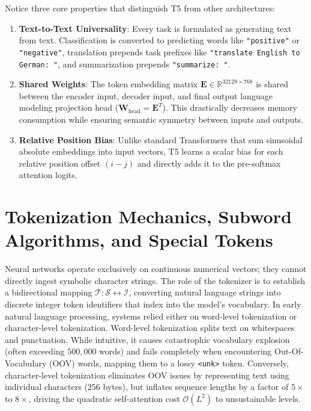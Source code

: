 \documentclass[11pt,a4paper]{article}
\begin{document}
Notice three core properties that distinguish T5 from other architectures:
\begin{enumerate}
    \item \textbf{Text-to-Text Universality}: Every task is formulated as generating text from text. Classification is converted to predicting words like \texttt{"positive"} or \texttt{"negative"}, translation prepends task prefixes like \texttt{"translate English to German: "}, and summarization prepends \texttt{"summarize: "}.
    \item \textbf{Shared Weights}: The token embedding matrix $\mathbf{E} \in \mathbb{R}^{32128 \times 768}$ is shared between the encoder input, decoder input, and final output language modeling projection head ($\mathbf{W}_{\text{head}} = \mathbf{E}^T$). This drastically decreases memory consumption while ensuring semantic symmetry between inputs and outputs.
    \item \textbf{Relative Position Bias}: Unlike standard Transformers that sum sinusoidal absolute embeddings into input vectors, T5 learns a scalar bias for each relative position offset $(i - j)$ and directly adds it to the pre-softmax attention logits.
\end{enumerate}


\section{Tokenization Mechanics, Subword Algorithms, and Special Tokens}

Neural networks operate exclusively on continuous numerical vectors; they cannot directly ingest symbolic character strings. The role of the tokenizer is to establish a bidirectional mapping $\mathcal{T}: \mathcal{S} \longleftrightarrow \mathcal{I}$, converting natural language strings into discrete integer token identifiers that index into the model's vocabulary. In early natural language processing, systems relied either on word-level tokenization or character-level tokenization. Word-level tokenization splits text on whitespaces and punctuation. While intuitive, it causes catastrophic vocabulary explosion (often exceeding $500{,}000$ words) and fails completely when encountering Out-Of-Vocabulary (OOV) words, mapping them to a lossy \texttt{<unk>} token. Conversely, character-level tokenization eliminates OOV issues by representing text using individual characters ($256$ bytes), but inflates sequence lengths by a factor of $5\times$ to $8\times$, driving the quadratic self-attention cost $\mathcal{O}(L^2)$ to unsustainable levels.
\end{document}
